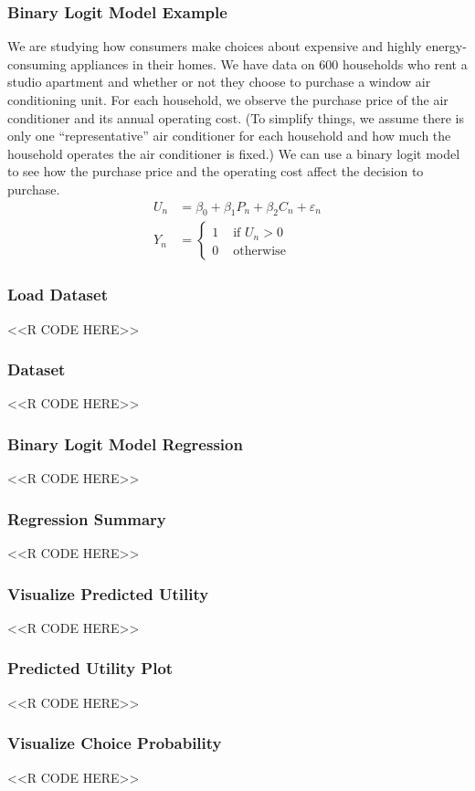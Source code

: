 \documentclass{beamer}
\begin{document}
\begin{frame}\frametitle{Binary Logit Model Example}
    We are studying how consumers make choices about expensive and highly energy-consuming appliances in their homes. We have data on 600 households who rent a studio apartment and whether or not they choose to purchase a window air conditioning unit. For each household, we observe the purchase price of the air conditioner and its annual operating cost. (To simplify things, we assume there is only one ``representative'' air conditioner for each household and how much the household operates the air conditioner is fixed.) We can use a binary logit model to see how the purchase price and the operating cost affect the decision to purchase.
    \begin{align*}
    	U_n &= \beta_0 + \beta_1 P_n + \beta_2 C_n + \varepsilon_n \\
    	Y_n &= 
    		\begin{cases}
    			1 & \text{ if } U_n > 0 \\
    			0 & \text{ otherwise}
    		\end{cases}
    \end{align*}
\end{frame}

\begin{frame}[fragile]\frametitle{Load Dataset}
    <<R CODE HERE>>
\end{frame}

\begin{frame}[fragile]\frametitle{Dataset}
    <<R CODE HERE>>
\end{frame}

\begin{frame}[fragile]\frametitle{Binary Logit Model Regression}
    <<R CODE HERE>>
\end{frame}

\begin{frame}[fragile]\frametitle{Regression Summary}
    <<R CODE HERE>>
\end{frame}

\begin{frame}[fragile]\frametitle{Visualize Predicted Utility}
    <<R CODE HERE>>
\end{frame}

\begin{frame}[fragile]\frametitle{Predicted Utility Plot}
    <<R CODE HERE>>
\end{frame}

\begin{frame}[fragile]\frametitle{Visualize Choice Probability}
    <<R CODE HERE>>
\end{frame}
\end{document}
